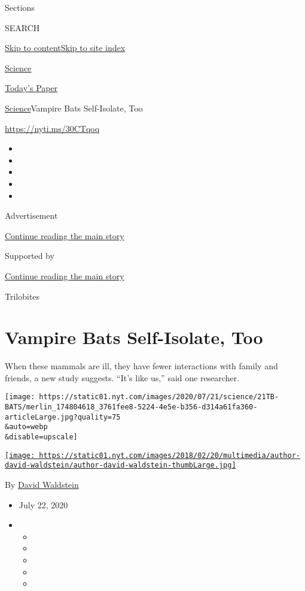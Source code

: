 Sections

SEARCH

\protect\hyperlink{site-content}{Skip to
content}\protect\hyperlink{site-index}{Skip to site index}

\href{https://www.nytimes.com/section/science}{Science}

\href{https://myaccount.nytimes.com/auth/login?response_type=cookie\&client_id=vi}{}

\href{https://www.nytimes.com/section/todayspaper}{Today's Paper}

\href{/section/science}{Science}\textbar{}Vampire Bats Self-Isolate, Too

\url{https://nyti.ms/30CTqoq}

\begin{itemize}
\item
\item
\item
\item
\item
\end{itemize}

Advertisement

\protect\hyperlink{after-top}{Continue reading the main story}

Supported by

\protect\hyperlink{after-sponsor}{Continue reading the main story}

Trilobites

\hypertarget{vampire-bats-self-isolate-too}{%
\section{Vampire Bats Self-Isolate,
Too}\label{vampire-bats-self-isolate-too}}

When these mammals are ill, they have fewer interactions with family and
friends, a new study suggests. ``It's like us,'' said one researcher.

\texttt{[image: https://static01.nyt.com/images/2020/07/21/science/21TB-BATS/merlin\_174804618\_3761fee8-5224-4e5e-b356-d314a61fa360-articleLarge.jpg?quality=75\\\&auto=webp\\\&disable=upscale]}

\href{https://www.nytimes.com/by/david-waldstein}{\texttt{[image: https://static01.nyt.com/images/2018/02/20/multimedia/author-david-waldstein/author-david-waldstein-thumbLarge.jpg]}}

By \href{https://www.nytimes.com/by/david-waldstein}{David Waldstein}

\begin{itemize}
\item
  July 22, 2020
\item
  \begin{itemize}
  \item
  \item
  \item
  \item
  \item
  \end{itemize}
\end{itemize}

